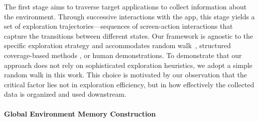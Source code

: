 \documentclass{article} %
\begin{document}
The first stage aims to traverse target applications to collect information about the environment.
Through successive interactions with the app, this stage yields a set of exploration trajectories—sequences of screen-action interactions that capture the transitions between different states.
Our framework is agnostic to the specific exploration strategy and accommodates random walk~\citep{sun2025genesis}, structured coverage-based methods \citep{gandhi2025go, ramrakhya2025scaling, shao2026hats}, or human demonstrations.
To demonstrate that our approach does not rely on sophisticated exploration heuristics, we adopt a simple random walk in this work.
This choice is motivated by our observation that the critical factor lies not in exploration efficiency, but in how effectively the collected data is organized and used downstream.



\paragraph{Global Environment Memory Construction}
\end{document}
